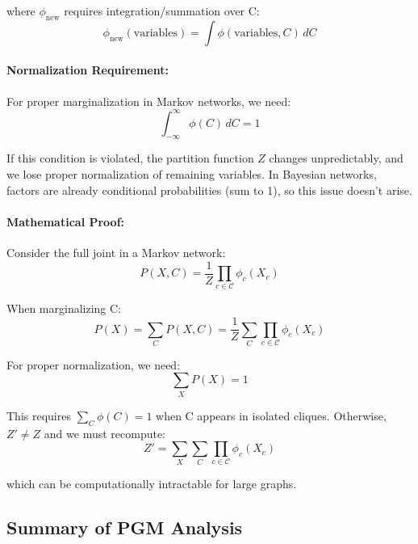 \documentclass[conference]{IEEEtran}
\begin{document}
where $\phi_{\text{new}}$ requires integration/summation over C:
\begin{equation}
\phi_{\text{new}}(\text{variables}) = \int \phi(\text{variables}, C) \, dC
\end{equation}

\paragraph{Normalization Requirement:}
For proper marginalization in Markov networks, we need:
\begin{equation}
\int_{-\infty}^{\infty} \phi(C) \, dC = 1
\end{equation}

If this condition is violated, the partition function $Z$ changes unpredictably, and we lose proper normalization of remaining variables. In Bayesian networks, factors are already conditional probabilities (sum to 1), so this issue doesn't arise.

\paragraph{Mathematical Proof:}
Consider the full joint in a Markov network:
\begin{equation}
P(X, C) = \frac{1}{Z} \prod_{c \in \mathcal{C}} \phi_c(X_c)
\end{equation}

When marginalizing C:
\begin{equation}
P(X) = \sum_C P(X, C) = \frac{1}{Z} \sum_C \prod_{c \in \mathcal{C}} \phi_c(X_c)
\end{equation}

For proper normalization, we need:
\begin{equation}
\sum_X P(X) = 1
\end{equation}

This requires $\sum_C \phi(C) = 1$ when C appears in isolated cliques. Otherwise, $Z' \neq Z$ and we must recompute:
\begin{equation}
Z' = \sum_X \sum_C \prod_{c \in \mathcal{C}} \phi_c(X_c)
\end{equation}

which can be computationally intractable for large graphs.

\subsection{Summary of PGM Analysis}
\end{document}
